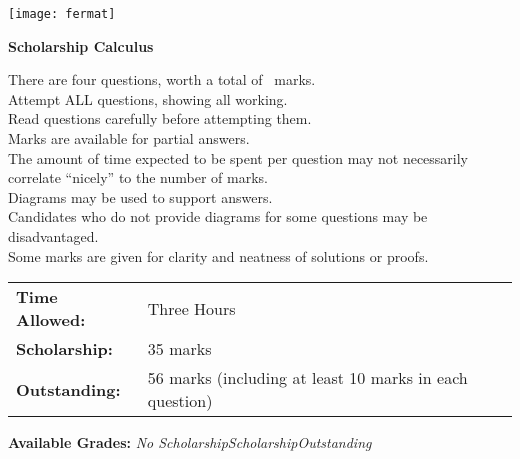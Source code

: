 \documentclass[addpoints,a4paper]{exam}
\begin{document}
\begin{coverpages}

\begin{center}
  \texttt{[image: fermat]}

  \vspace{5mm}

  \textbf{\Huge{Scholarship Calculus}}
\end{center}

\vspace{5mm}

\noindent
\large{There are four questions, worth a total of \numpoints\ marks.\\
       Attempt ALL questions, showing all working.\\
       Read questions carefully before attempting them.\\
       Marks are available for partial answers.\\
       The amount of time expected to be spent per question may not necessarily correlate ``nicely'' to the number of marks.\\
       Diagrams may be used to support answers.\\
       Candidates who do not provide diagrams for some questions may be disadvantaged.\\
       Some marks are given for clarity and neatness of solutions or proofs.}
\vspace{2mm}

\begin{tabular}{ll}
  \textbf{Time Allowed:}& Three Hours\\
  \textbf{Scholarship:}& 35 marks\\
  \textbf{Outstanding:}& 56 marks (including at least 10 marks in each question)
\end{tabular}

\vfill

\begin{center}
  \gradetable[h][questions]
  \vspace{2mm}

  \textbf{Available Grades:} \textit{No Scholarship}\quad\textit{Scholarship}\quad\textit{Outstanding}
\end{center}

\end{coverpages}
\end{document}
